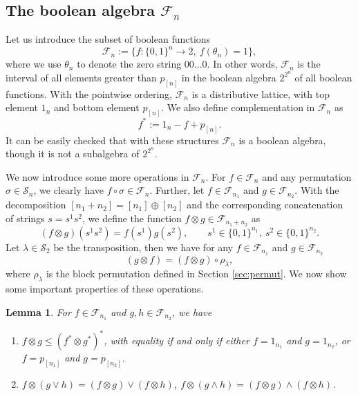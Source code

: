 \documentclass[12pt]{article}
\newtheorem{lemma}{Lemma}
\theoremstyle{definition}
\theoremstyle{remark}
\def\Fe{\mathcal F}
\def\permut{\mathscr{S}}
\begin{document}
\subsection{The boolean algebra $\Fe_n$}


Let us introduce the subset of boolean functions 
\[
\Fe_n:=\{f:\{0,1\}^n\to 2,\ f(\theta_n)=1\},
\]
where we use $\theta_n$ to denote the zero string $00\dots 0$. 
In other words, $\Fe_n$ is the interval of all elements greater than $p_{[n]}$ in the boolean algebra 
$2^{2^n}$ of all boolean functions. With the pointwise ordering, $\Fe_n$ is a distributive lattice, with top element $1_n$ and 
 bottom element $p_{[n]}$. We also define complementation  in $\Fe_n$ as
\[
f^*:=1_n-f+p_{[n]}.
\]
It can be easily checked that with these structures $\Fe_n$ is a boolean algebra, though
it is not a subalgebra of $2^{2^n}$.

We now introduce some more operations in $\Fe_n$. For $f\in \Fe_n$ and any permutation
$\sigma\in \permut_n$, we clearly have $f\circ \sigma\in \Fe_n$.
Further, let $f\in \Fe_{n_1}$ and $g\in \Fe_{n_2}$. With the decomposition
$[n_1+n_2]=[n_1]\oplus [n_2]$
and the corresponding concatenation of strings $s=s^1s^2$,  we define
the function $f\otimes g\in \Fe_{n_1+n_2}$ as
\[
(f\otimes g)(s^1s^2)=f(s^1)g(s^2),\qquad s^1\in \{0,1\}^{n_1},\ s^2\in \{0,1\}^{n_2}.
\]
Let $\lambda\in \permut_2$ be the transposition, then we have for any $f\in \Fe_{n_1}$ and
$g\in \Fe_{n_2}$
\[
(g\otimes f)=(f\otimes g)\circ \rho_\lambda,
\]
where $\rho_\lambda$ is the block permutation defined in  Section \ref{sec:permut}.
We now show some important properties of these operations.

\begin{lemma}\label{lemma:fproduct} For $f\in \Fe_{n_1}$ and  $g,h\in \Fe_{n_2}$, we have
\begin{enumerate}
\item[(i)] $f\otimes g\le (f^*\otimes g^*)^*$, with equality if and only if either
$f=1_{n_1}$ and $g=1_{n_2}$, or $f=p_{[n_1]}$ and $g=p_{[n_2]}$.
\item[(ii)] $f\otimes (g\vee h)= (f\otimes g)\vee (f\otimes h)$, $f\otimes (g\wedge h)=
(f\otimes g)\wedge (f\otimes h)$.
\end{enumerate}

\end{lemma}
\end{document}
